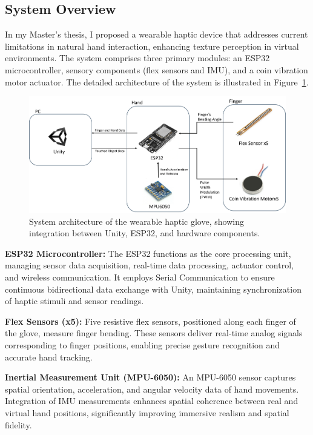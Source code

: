 \documentclass[graybox]{svmult}
\begin{document}
\subsection{System Overview}
\label{sec:System Overview}
In my Master's thesis, I proposed a wearable haptic device that addresses current limitations in natural hand interaction, enhancing texture perception in virtual environments. The system comprises three primary modules: an ESP32 microcontroller, sensory components (flex sensors and IMU), and a coin vibration motor actuator. The detailed architecture of the system is illustrated in Figure~\ref{fig:system_diagram}.

\begin{figure}\centering
	\includegraphics[width=1\textwidth]{figure/system diagram.png}%
	\caption{System architecture of the wearable haptic glove, showing integration between Unity, ESP32, and hardware components.}\label{fig:system_diagram}
\end{figure}
\textbf{ESP32 Microcontroller:}
The ESP32 functions as the core processing unit, managing sensor data acquisition, real-time data processing, actuator control, and wireless communication. It employs Serial Communication to ensure continuous bidirectional data exchange with Unity, maintaining synchronization of haptic stimuli and sensor readings.

\textbf{Flex Sensors (x5):}
Five resistive flex sensors, positioned along each finger of the glove, measure finger bending. These sensors deliver real-time analog signals corresponding to finger positions, enabling precise gesture recognition and accurate hand tracking.

\textbf{Inertial Measurement Unit (MPU-6050):}
An MPU-6050 sensor captures spatial orientation, acceleration, and angular velocity data of hand movements. Integration of IMU measurements enhances spatial coherence between real and virtual hand positions, significantly improving immersive realism and spatial fidelity.
\end{document}
